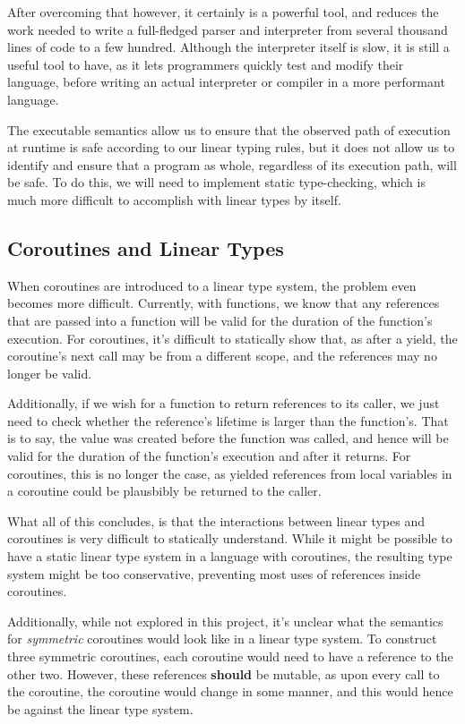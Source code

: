 \documentclass[review,twocolumn]{sigplanconf}
\begin{document}
After overcoming that however, it certainly is a powerful tool, and reduces the work needed to write a full-fledged parser and interpreter from several thousand lines of code to a few hundred. Although the interpreter itself is slow, it is still a useful tool to have, as it lets programmers quickly test and modify their language, before writing an actual interpreter or compiler in a more performant language.

The executable semantics allow us to ensure that the observed path of execution at runtime is safe according to our linear typing rules, but it does not allow us to identify and ensure that a program as whole, regardless of its execution path, will be safe. To do this, we will need to implement static type-checking, which is much more difficult to accomplish with linear types by itself.
\subsection*{Coroutines and Linear Types}

When coroutines are introduced to a linear type system, the problem even becomes more difficult. Currently, with functions, we know that any references that are passed into a function will be valid for the duration of the function's execution. For coroutines, it's difficult to statically show that, as after a yield, the coroutine's next call may be from a different scope, and the references may no longer be valid.

Additionally, if we wish for a function to return references to its caller, we just need to check whether the reference's lifetime is larger than the function's. That is to say, the value was created before the function was called, and hence will be valid for the duration of the function's execution and after it returns. For coroutines, this is no longer the case, as yielded references from local variables in a coroutine could be plausbibly be returned to the caller.

What all of this concludes, is that the interactions between linear types and coroutines is very difficult to statically understand. While it might be possible to have a static linear type system in a language with coroutines, the resulting type system might be too conservative, preventing most uses of references inside coroutines.

Additionally, while not explored in this project, it's unclear what the semantics for \textit{symmetric} coroutines would look like in a linear type system. To construct three symmetric coroutines, each coroutine would need to have a reference to the other two. However, these references \textbf{should} be mutable, as upon every call to the coroutine, the coroutine would change in some manner, and this would hence be against the linear type system.
\end{document}
